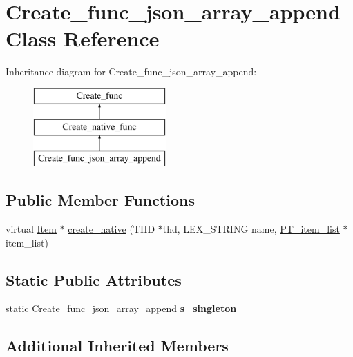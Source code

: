 \hypertarget{classCreate__func__json__array__append}{}\section{Create\+\_\+func\+\_\+json\+\_\+array\+\_\+append Class Reference}
\label{classCreate__func__json__array__append}
Inheritance diagram for Create\+\_\+func\+\_\+json\+\_\+array\+\_\+append\+:\begin{figure}[H]
\begin{center}
\leavevmode
\includegraphics[height=3.000000cm]{classCreate__func__json__array__append}
\end{center}
\end{figure}
\subsection*{Public Member Functions}
\begin{DoxyCompactItemize}
\item 
virtual \mbox{\hyperlink{classItem}{Item}} $\ast$ \mbox{\hyperlink{classCreate__func__json__array__append_aecbe64dad41e281a2323793693b35b5f}{create\+\_\+native}} (T\+HD $\ast$thd, L\+E\+X\+\_\+\+S\+T\+R\+I\+NG name, \mbox{\hyperlink{classPT__item__list}{P\+T\+\_\+item\+\_\+list}} $\ast$item\+\_\+list)
\end{DoxyCompactItemize}
\subsection*{Static Public Attributes}
\begin{DoxyCompactItemize}
\item 
\mbox{\label{classCreate__func__json__array__append_a544b9e5639a77ba027e8603170257cb6}} 
static \mbox{\hyperlink{classCreate__func__json__array__append}{Create\+\_\+func\+\_\+json\+\_\+array\+\_\+append}} {\bfseries s\+\_\+singleton}
\end{DoxyCompactItemize}
\subsection*{Additional Inherited Members}


